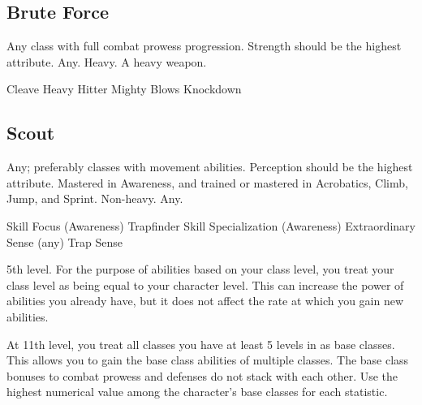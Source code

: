     \subsection{Brute Force}
         Any class with full combat prowess progression.
         Strength should be the highest attribute.
         Any.
         Heavy.
         A heavy weapon.

        \begin{enumerate}[leftmargin=3em]
            \itempath Cleave
            \itempath Heavy Hitter
            \itempath Mighty Blows
            \itempath Knockdown
        \end{enumerate}

    \subsection{Scout}
         Any; preferably classes with movement abilities.
         Perception should be the highest attribute.
         Mastered in Awareness, and trained or mastered in Acrobatics, Climb, Jump, and Sprint.
         Non-heavy.
         Any.

        \begin{enumerate}[leftmargin=3em]
            \itempath Skill Focus (Awareness)
            \itempath Trapfinder
            \itempath Skill Specialization (Awareness)
            \itempath Extraordinary Sense (any)
            \itempath Trap Sense
        \end{enumerate}

    \featpre 5th level.
    \featben For the purpose of abilities based on your class level, you treat your class level as being equal to your character level.
    This can increase the power of abilities you already have, but it does not affect the rate at which you gain new abilities.

    At 11th level, you treat all classes you have at least 5 levels in as base classes.
    This allows you to gain the base class abilities of multiple classes.
    The base class bonuses to combat prowess and defenses do not stack with each other.
    Use the highest numerical value among the character's base classes for each statistic.
